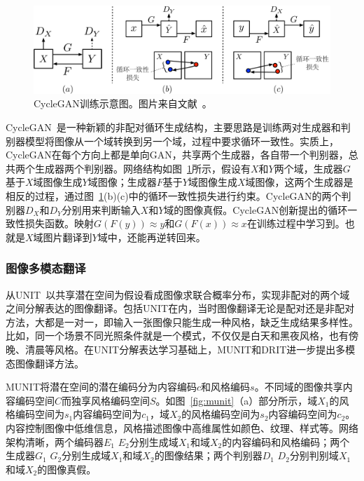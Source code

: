 \begin{figure}[ht]
    \centering
	\includegraphics[width=\textwidth]{figures/cyclegan.pdf}
	\caption{CycleGAN训练示意图。图片来自文献~\cite{zhu2017unpaired}。}
	\label{fig:cyclegan}
\end{figure}

CycleGAN~\cite{zhu2017unpaired}是一种新颖的非配对循环生成结构，主要思路是训练两对生成器和判别器模型将图像从一个域转换到另一个域，过程中要求循环一致性。实质上，CycleGAN在每个方向上都是单向GAN，共享两个生成器，各自带一个判别器，总共两个生成器两个判别器。网络结构如图~\ref{fig:cyclegan}所示，假设有$X$和$Y$两个域，生成器$G$基于$X$域图像生成$Y$域图像；生成器$F$基于$Y$域图像生成$X$域图像，这两个生成器是相反的过程，通过图~\ref{fig:cyclegan}(b)(c)中的循环一致性损失进行约束。CycleGAN的两个判别器$D_X$和$D_Y$分别用来判断输入$X$和$Y$域的图像真假。CycleGAN创新提出的循环一致性损失函数。映射$ G(F(y)) \approx y$和$ G(F(x)) \approx x$在训练过程中学习到。也就是$X$域图片翻译到$Y$域中，还能再逆转回来。

\subsubsection{图像多模态翻译}
从UNIT~\cite{liu2017unsupervised}以共享潜在空间为假设看成图像求联合概率分布，实现非配对的两个域之间分解表达的图像翻译。包括UNIT在内，当时图像翻译无论是配对还是非配对方法，大都是一对一，即输入一张图像只能生成一种风格，缺乏生成结果多样性。比如，同一个场景不同光照条件就是一个模式，不仅仅是白天和黑夜风格，也有傍晚、清晨等风格。在UNIT分解表达学习基础上，MUNIT和DRIT进一步提出多模态图像翻译方法。

MUNIT将潜在空间的潜在编码分为内容编码$c$和风格编码$s$。不同域的图像共享内容编码空间$C$而独享风格编码空间$S$。如图~\ref{fig:munit}（a）部分所示，域$X_1$的风格编码空间为$s_1$内容编码空间为$c_1$，域$X_2$的风格编码空间为$s_2$内容编码空间为$c_2$。内容控制图像中低维信息，风格描述图像中高维属性如颜色、纹理、样式等。网络架构清晰，两个编码器$E_1$ $E_2$分别生成域$X_1$和域$X_2$的内容编码和风格编码；两个生成器$G_1$ $G_2$分别生成域$X_1$和域$X_2$的图像结果；两个判别器$D_1$ $D_2$分别判别域$X_1$和域$X_2$的图像真假。

